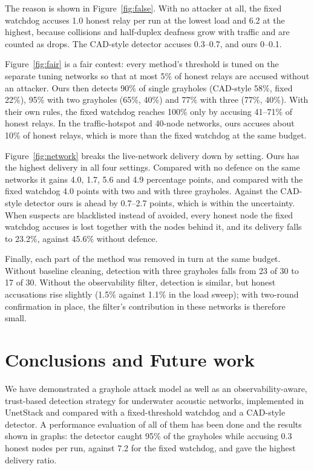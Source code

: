 \documentclass[conference]{IEEEtran}
\begin{document}
The reason is shown in Figure~\ref{fig:false}. With no attacker at all, the fixed watchdog accuses 1.0 honest relay per run at the lowest load and 6.2 at the highest, because collisions and half-duplex deafness grow with traffic and are counted as drops. The CAD-style detector accuses 0.3--0.7, and ours 0--0.1.

Figure~\ref{fig:fair} is a fair contest: every method's threshold is tuned on the separate tuning networks so that at most 5\% of honest relays are accused without an attacker. Ours then detects 90\% of single grayholes (CAD-style 58\%, fixed 22\%), 95\% with two grayholes (65\%, 40\%) and 77\% with three (77\%, 40\%). With their own rules, the fixed watchdog reaches 100\% only by accusing 41--71\% of honest relays. In the traffic-hotspot and 40-node networks, ours accuses about 10\% of honest relays, which is more than the fixed watchdog at the same budget.

Figure~\ref{fig:network} breaks the live-network delivery down by setting. Ours has the highest delivery in all four settings. Compared with no defence on the same networks it gains 4.0, 1.7, 5.6 and 4.9 percentage points, and compared with the fixed watchdog 4.0 points with two and with three grayholes. Against the CAD-style detector ours is ahead by 0.7--2.7 points, which is within the uncertainty. When suspects are blacklisted instead of avoided, every honest node the fixed watchdog accuses is lost together with the nodes behind it, and its delivery falls to 23.2\%, against 45.6\% without defence.

Finally, each part of the method was removed in turn at the same budget. Without baseline cleaning, detection with three grayholes falls from 23 of 30 to 17 of 30. Without the observability filter, detection is similar, but honest accusations rise slightly (1.5\% against 1.1\% in the load sweep); with two-round confirmation in place, the filter's contribution in these networks is therefore small.

\section{Conclusions and Future work}\label{sec:conclusion}
We have demonstrated a grayhole attack model as well as an observability-aware, trust-based detection strategy for underwater acoustic networks, implemented in UnetStack and compared with a fixed-threshold watchdog and a CAD-style detector. A performance evaluation of all of them has been done and the results shown in graphs: the detector caught 95\% of the grayholes while accusing 0.3 honest nodes per run, against 7.2 for the fixed watchdog, and gave the highest delivery ratio.
\end{document}
